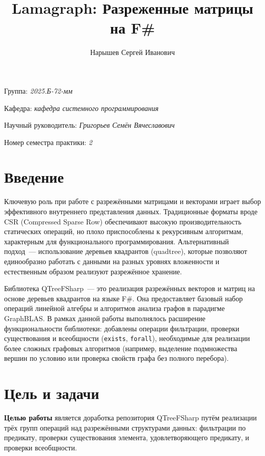 \documentclass[a4paper]{article}
\title{Lamagraph: Разреженные матрицы на F\#}
\author{Нарышев Сергей Иванович}
\date{}
\begin{document}
\maketitle

\begin{flushright}
    Группа: \emph{2025.Б-72-мм}

    Кафедра: \emph{кафедра системного программирования}

    Научный руководитель: \emph{Григорьев Семён Вячеславович}

    Номер семестра практики: \emph{2}
\end{flushright}

\section{Введение}

Ключевую роль при работе с разрежёнными матрицами и векторами играет выбор эффективного внутреннего представления данных. Традиционные форматы вроде CSR (Compressed Sparse Row) обеспечивают высокую производительность статических операций, но плохо приспособлены к рекурсивным алгоритмам, характерным для функционального программирования. Альтернативный подход~--- использование деревьев квадрантов (quadtree), которые позволяют единообразно работать с данными на разных уровнях вложенности и естественным образом реализуют разрежённое хранение.

Библиотека QTreeFSharp~--- это реализация разрежённых векторов и матриц на основе деревьев квадрантов на языке F\#. Она предоставляет базовый набор операций линейной алгебры и алгоритмов анализа графов в парадигме Graph\-BLAS. В рамках данной работы выполнялось расширение функциональности библиотеки: добавлены операции фильтрации, проверки существования и всеобщности (\texttt{exists}, \texttt{forall}), необходимые для реализации более сложных графовых алгоритмов (например, выделение подмножества вершин по условию или проверка свойств графа без полного перебора).

\section{Цель и задачи}

\textbf{Целью работы} является доработка репозитория QTreeFSharp путём реализации трёх групп операций над разрежёнными структурами данных: фильтрации по предикату, проверки существования элемента, удовлетворяющего предикату, и проверки всеобщности.
\end{document}
